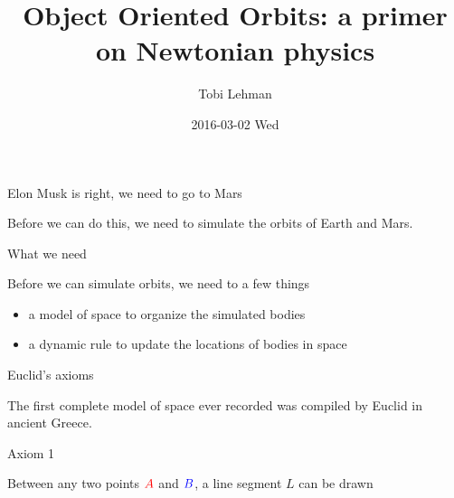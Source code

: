 \documentclass[bigger]{beamer}
\author{Tobi Lehman}
\date{2016-03-02 Wed}
\title{Object Oriented Orbits: a primer on Newtonian physics}
\begin{document}
\maketitle

\begin{frame}[label=sec-1]{Elon Musk is right, we need to go to Mars}
\begin{center}
\end{center}

\begin{block}{Before we can do this, we need to simulate the orbits of Earth and Mars.}
\end{block}
\end{frame}

\begin{frame}[label=sec-2]{What we need}
\begin{block}{Before we can simulate orbits, we need to a few things}
\begin{itemize}
\item a \alert{model of space} to organize the simulated bodies
\item a \alert{dynamic rule} to update the locations of bodies in space
\end{itemize}
\end{block}
\end{frame}

\begin{frame}[label=sec-3]{Euclid's axioms}
\begin{block}{The first complete model of space ever recorded was compiled by Euclid in ancient Greece.}
\end{block}
\end{frame}

\begin{frame}[label=sec-4]{Axiom 1}
\begin{block}{Between any two points ${\color{red} A}$ and ${\color{blue} B}$, a line segment $L$ can be drawn}
\begin{center}
\end{center}
\end{block}
\end{frame}
\end{document}
